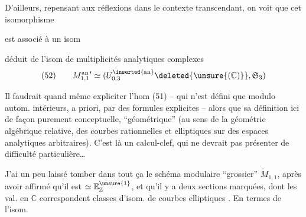 D'ailleurs, repensant aux réflexions dans le
contexte transcendant, on voit que
cet isomorphisme


est associé à un isom


déduit de l'isom de multiplicités analytiques
complexes
\[
(52)\qquad M_{1,1}^{\mathrm{an}\,\prime}\simeq
(U_{0,3}^{\inserted{\mathrm{an}}}\deleted{\unsure{(\mathbb C)}},\mathfrak S_3)
\]

Il faudrait quand même expliciter
l'hom (51) -- qui n'est défini que
modulo autom. intérieurs, a priori,
par des formules explicites -- alors que
sa définition ici  de façon purement conceptuelle, ``géométrique'' (au sens
de la géométrie algébrique relative, des
courbes rationnelles et elliptiques sur des
espaces analytiques arbitraires). C'est là
un calcul-clef,  qui ne devrait pas
présenter de difficulté particulière\ldots


J'ai un peu laissé tomber  dans tout
ça le schéma modulaire ``grossier'' $\widetilde M_{1,1}$,
après avoir affirmé qu'il est $\simeq\mathbb E_{\mathbb Z}^{\unsure{1}}$, et
qu'il y a deux sections marquées,
dont les  val. en $\mathbb C$\unsure{,} correspondent
  classes d'isom. de courbes elliptiques
. En termes de l'isom.
